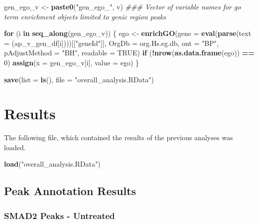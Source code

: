 \documentclass[]{article}
\newenvironment{Shaded}{\begin{snugshade}}{\end{snugshade}}
\newcommand{\CommentTok}[1]{\textcolor[rgb]{0.56,0.35,0.01}{\textit{#1}}}
\newcommand{\ControlFlowTok}[1]{\textcolor[rgb]{0.13,0.29,0.53}{\textbf{#1}}}
\newcommand{\DataTypeTok}[1]{\textcolor[rgb]{0.13,0.29,0.53}{#1}}
\newcommand{\DecValTok}[1]{\textcolor[rgb]{0.00,0.00,0.81}{#1}}
\newcommand{\KeywordTok}[1]{\textcolor[rgb]{0.13,0.29,0.53}{\textbf{#1}}}
\newcommand{\NormalTok}[1]{#1}
\newcommand{\OperatorTok}[1]{\textcolor[rgb]{0.81,0.36,0.00}{\textbf{#1}}}
\newcommand{\OtherTok}[1]{\textcolor[rgb]{0.56,0.35,0.01}{#1}}
\newcommand{\StringTok}[1]{\textcolor[rgb]{0.31,0.60,0.02}{#1}}
\begin{document}
\begin{Shaded}
\begin{Highlighting}[]
\NormalTok{gen_ego_v <-}\StringTok{ }\KeywordTok{paste0}\NormalTok{(}\StringTok{"gen_ego_"}\NormalTok{, v)  }\CommentTok{### Vector of variable names for go term enrichment objects limited to genic region peaks}


\ControlFlowTok{for}\NormalTok{ (i }\ControlFlowTok{in} \KeywordTok{seq_along}\NormalTok{(gen_ego_v)) \{}
\NormalTok{    ego <-}\StringTok{ }\KeywordTok{enrichGO}\NormalTok{(}\DataTypeTok{gene =} \KeywordTok{eval}\NormalTok{(}\KeywordTok{parse}\NormalTok{(}\DataTypeTok{text =}\NormalTok{ (ap_v_gen_df[i])))[[}\StringTok{"geneId"}\NormalTok{]], }
        \DataTypeTok{OrgDb =}\NormalTok{ org.Hs.eg.db, }\DataTypeTok{ont =} \StringTok{"BP"}\NormalTok{, }\DataTypeTok{pAdjustMethod =} \StringTok{"BH"}\NormalTok{, }\DataTypeTok{readable =} \OtherTok{TRUE}\NormalTok{)}
    \ControlFlowTok{if}\NormalTok{ (}\OperatorTok{!}\KeywordTok{nrow}\NormalTok{(}\KeywordTok{as.data.frame}\NormalTok{(ego)) }\OperatorTok{==}\StringTok{ }\DecValTok{0}\NormalTok{) }
        \KeywordTok{assign}\NormalTok{(}\DataTypeTok{x =}\NormalTok{ gen_ego_v[i], }\DataTypeTok{value =}\NormalTok{ ego)}
\NormalTok{\}}

\KeywordTok{save}\NormalTok{(}\DataTypeTok{list =} \KeywordTok{ls}\NormalTok{(), }\DataTypeTok{file =} \StringTok{"overall_analysis.RData"}\NormalTok{)}
\end{Highlighting}
\end{Shaded}

\hypertarget{results}{%
\section{Results}\label{results}}

The following file, which contained the results of the previous analyses
was loaded.

\begin{Shaded}
\begin{Highlighting}[]
\KeywordTok{load}\NormalTok{(}\StringTok{"overall_analysis.RData"}\NormalTok{)}
\end{Highlighting}
\end{Shaded}

\hypertarget{peak-annotation-results}{%
\subsection{Peak Annotation Results}\label{peak-annotation-results}}

\hypertarget{smad2-peaks---untreated}{%
\subsubsection{SMAD2 Peaks - Untreated}\label{smad2-peaks---untreated}}
\end{document}
